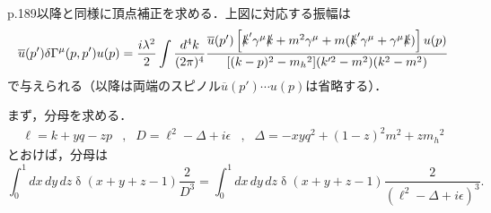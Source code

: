 p.189以降と同様に頂点補正を求める．上図に対応する振幅は
\[
\overline{u}(p') \delta\Gamma^\mu(p, p') u(p) = \frac{i\lambda^2}{2} \int \frac{d^4k}{(2\pi)^4}
\frac{\overline{u}(p') \left[ \slashed{k}' \gamma^\mu \slashed{k} + m^2\gamma^\mu + m(\slashed{k}' \gamma^\mu + \gamma^\mu \slashed{k}) \right] u(p)}
{[(k-p)^2 - m_h{}^2](k'^2 - m^2)(k^2 - m^2)}
\]
で与えられる（以降は両端のスピノル$\overline{u}(p') \cdots u(p)$は省略する）．

まず，分母を求める．
\begin{align*}
  \ell = k + yq - zp & , & D = \ell^2 - \Delta + i\epsilon & , & \Delta = -xyq^2 + (1-z)^2 m^2 +zm_h{}^2
\end{align*}
とおけば，分母は
\[ \int_0^1 dx \, dy \, dz  \mathop\delta(x+y+z-1) \frac{2}{D^3} = \int_0^1 dx \, dy \, dz  \mathop\delta(x+y+z-1) \frac{2}{(\ell^2 - \Delta + i\epsilon)^3} . \]

